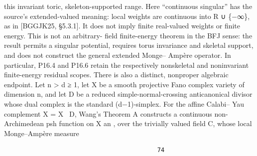 \documentclass[
  10pt,
]{article}
\begin{document}
this invariant toric, skeleton-supported range. Here ``continuous
singular'' has the source's extended-valued meaning: local weights are
continuous into R ∪ \{−∞\}, as in {[}BGGJK25, §5.3.1{]}. It does not
imply ﬁnite real-valued weights or ﬁnite energy. This is not an
arbitrary- ﬁeld ﬁnite-energy theorem in the BFJ sense: the result
permits a singular potential, requires torus invariance and skeletal
support, and does not construct the general extended Monge-- Ampère
operator. In particular, P16.4 and P16.6 retain the respectively
nonskeletal and noninvariant ﬁnite-energy residual scopes. There is also
a distinct, nonproper algebraic endpoint. Let n \textgreater{} d ≥ 1,
let X be a smooth projective Fano complex variety of dimension n, and
let D be a reduced simple-normal-crossing anticanonical divisor whose
dual complex is the standard (d−1)-simplex. For the aﬃne Calabi-- Yau
complement X = X ~D, Wang's Theorem A constructs a continuous
non-Archimedean psh function on X an , over the trivially valued ﬁeld C,
whose local Monge--Ampère measure

\begin{verbatim}
                                           74
\end{verbatim}
\end{document}
